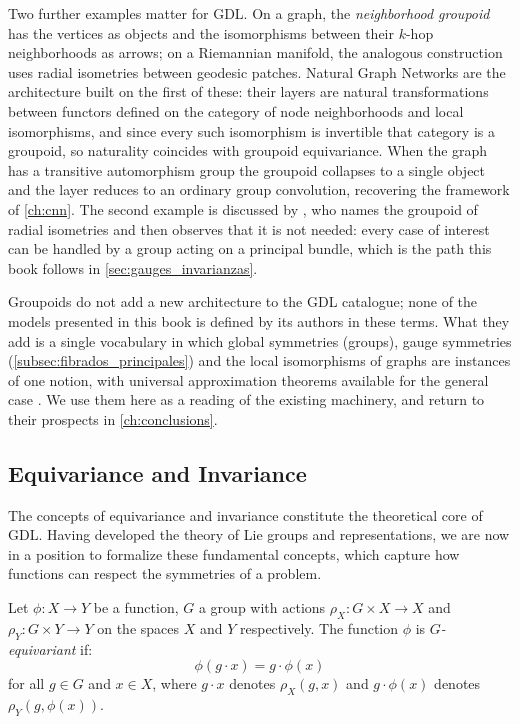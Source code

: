 Two further examples matter for \gls{GDL}. On a graph, the \textit{neighborhood groupoid} has the vertices as objects and the isomorphisms between their $k$-hop neighborhoods as arrows; on a Riemannian manifold, the analogous construction uses radial isometries between geodesic patches. Natural Graph Networks \citep{dehaan2020natural} are the architecture built on the first of these: their layers are natural transformations between functors defined on the category of node neighborhoods and local isomorphisms, and since every such isomorphism is invertible that category is a groupoid, so naturality coincides with groupoid equivariance. When the graph has a transitive automorphism group the groupoid collapses to a single object and the layer reduces to an ordinary group convolution, recovering the framework of \autoref{ch:cnn}. The second example is discussed by \citet{cohen2021thesis}, who names the groupoid of radial isometries and then observes that it is not needed: every case of interest can be handled by a group acting on a principal bundle, which is the path this book follows in \autoref{sec:gauges_invarianzas}.

\begin{remark}\label{rem:alcance_grupoides}
Groupoids do not add a new architecture to the \gls{GDL} catalogue; none of the models presented in this book is defined by its authors in these terms. What they add is a single vocabulary in which global symmetries (groups), gauge symmetries (\autoref{subsec:fibrados_principales}) and the local isomorphisms of graphs are instances of one notion, with universal approximation theorems available for the general case \citep{maruyama2025categorical, astwood2026liegroupoid}. We use them here as a reading of the existing machinery, and return to their prospects in \autoref{ch:conclusions}.
\end{remark}

\subsection{Equivariance and Invariance}\label{subsec:equivarianza_invarianza}

The concepts of equivariance and invariance constitute the theoretical core of \gls{GDL}. Having developed the theory of Lie groups and representations, we are now in a position to formalize these fundamental concepts, which capture how functions can respect the symmetries of a problem.

\begin{definition}\label{def:equivariance_gdl}
Let $\phi: X \rightarrow Y$ be a function, $G$ a group with actions $\rho_X: G \times X \rightarrow X$ and $\rho_Y: G \times Y \rightarrow Y$ on the spaces $X$ and $Y$ respectively. The function $\phi$ is \textit{$G$-equivariant} if:
\begin{equation}
\phi(g \cdot x) = g \cdot \phi(x)
\label{eq:equivariance_gdl_formal}
\end{equation}
for all $g \in G$ and $x \in X$, where $g \cdot x$ denotes $\rho_X(g, x)$ and $g \cdot \phi(x)$ denotes $\rho_Y(g, \phi(x))$.
\end{definition}

